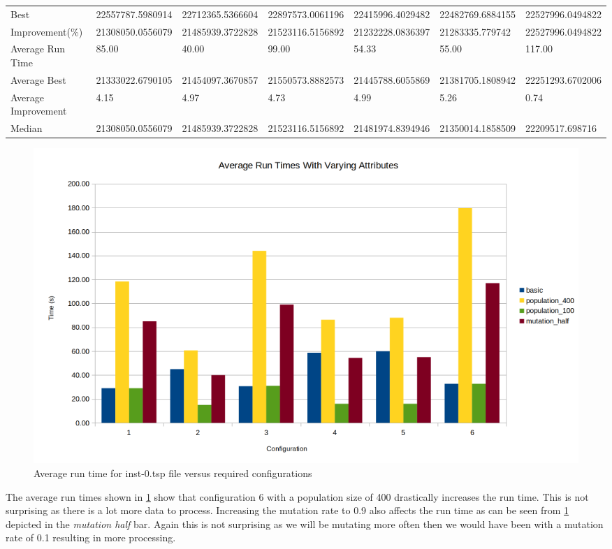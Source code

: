 \begin{table}[H]
{\begin{tabular}{lllllll}
\cellcolor[HTML]{ECF4FF}Best                & 22557787.5980914 & 22712365.5366604 & 22897573.0061196 & 22415996.4029482 & 22482769.6884155 & 22527996.0494822 \\
\cellcolor[HTML]{ECF4FF}Improvement(\%)     & 21308050.0556079 & 21485939.3722828 & 21523116.5156892 & 21232228.0836397 & 21283335.779742  & 22527996.0494822 \\
\rowcolor[HTML]{CBCEFB} 
\cellcolor[HTML]{DAE8FC}Average Run Time    & 85.00            & 40.00            & 99.00            & 54.33            & 55.00            & 117.00           \\
\rowcolor[HTML]{CBCEFB} 
\cellcolor[HTML]{DAE8FC}Average Best        & 21333022.6790105 & 21454097.3670857 & 21550573.8882573 & 21445788.6055869 & 21381705.1808942 & 22251293.6702006 \\
\rowcolor[HTML]{CBCEFB} 
\cellcolor[HTML]{DAE8FC}Average Improvement & 4.15             & 4.97             & 4.73             & 4.99             & 5.26             & 0.74             \\
\rowcolor[HTML]{CBCEFB} 
\cellcolor[HTML]{DAE8FC}Median              & 21308050.0556079 & 21485939.3722828 & 21523116.5156892 & 21481974.8394946 & 21350014.1858509 & 22209517.698716 
\end{tabular}%
}
\end{table}

\begin{figure}[H]
\vspace{-5pt}
\centering
\includegraphics[width=1.0\textwidth]{images/inst-0-run-time.png}
\caption{\label{fig:inst-0-run-time}Average run time for inst-0.tsp file versus required configurations}
\end{figure}

The average run times shown in \ref{fig:inst-0-run-time} show that configuration 6 with a population size of 400 drastically increases the run time. This is not surprising as there is a lot more data to process.
Increasing the mutation rate to 0.9 also affects the run time as can be seen from \ref{fig:inst-0-run-time} depicted in the \textit{mutation half} bar. Again this is not surprising as we will be mutating more often then we would have been with a mutation rate of 0.1 resulting in more processing.


